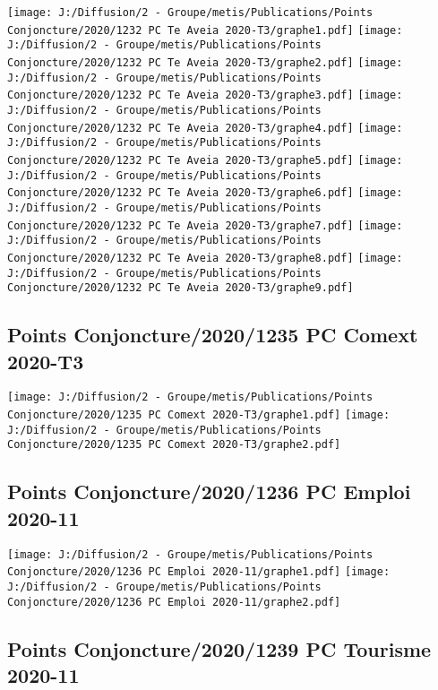 \documentclass[
]{article}
\begin{document}
\texttt{[image: J:/Diffusion/2 - Groupe/metis/Publications/Points Conjoncture/2020/1232 PC Te Aveia 2020-T3/graphe1.pdf]}
\texttt{[image: J:/Diffusion/2 - Groupe/metis/Publications/Points Conjoncture/2020/1232 PC Te Aveia 2020-T3/graphe2.pdf]}
\texttt{[image: J:/Diffusion/2 - Groupe/metis/Publications/Points Conjoncture/2020/1232 PC Te Aveia 2020-T3/graphe3.pdf]}
\texttt{[image: J:/Diffusion/2 - Groupe/metis/Publications/Points Conjoncture/2020/1232 PC Te Aveia 2020-T3/graphe4.pdf]}
\texttt{[image: J:/Diffusion/2 - Groupe/metis/Publications/Points Conjoncture/2020/1232 PC Te Aveia 2020-T3/graphe5.pdf]}
\texttt{[image: J:/Diffusion/2 - Groupe/metis/Publications/Points Conjoncture/2020/1232 PC Te Aveia 2020-T3/graphe6.pdf]}
\texttt{[image: J:/Diffusion/2 - Groupe/metis/Publications/Points Conjoncture/2020/1232 PC Te Aveia 2020-T3/graphe7.pdf]}
\texttt{[image: J:/Diffusion/2 - Groupe/metis/Publications/Points Conjoncture/2020/1232 PC Te Aveia 2020-T3/graphe8.pdf]}
\texttt{[image: J:/Diffusion/2 - Groupe/metis/Publications/Points Conjoncture/2020/1232 PC Te Aveia 2020-T3/graphe9.pdf]}

\hypertarget{points-conjoncture20201235-pc-comext-2020-t3}{%
\subsection{Points Conjoncture/2020/1235 PC Comext
2020-T3}\label{points-conjoncture20201235-pc-comext-2020-t3}}

\texttt{[image: J:/Diffusion/2 - Groupe/metis/Publications/Points Conjoncture/2020/1235 PC Comext 2020-T3/graphe1.pdf]}
\texttt{[image: J:/Diffusion/2 - Groupe/metis/Publications/Points Conjoncture/2020/1235 PC Comext 2020-T3/graphe2.pdf]}

\hypertarget{points-conjoncture20201236-pc-emploi-2020-11}{%
\subsection{Points Conjoncture/2020/1236 PC Emploi
2020-11}\label{points-conjoncture20201236-pc-emploi-2020-11}}

\texttt{[image: J:/Diffusion/2 - Groupe/metis/Publications/Points Conjoncture/2020/1236 PC Emploi 2020-11/graphe1.pdf]}
\texttt{[image: J:/Diffusion/2 - Groupe/metis/Publications/Points Conjoncture/2020/1236 PC Emploi 2020-11/graphe2.pdf]}

\hypertarget{points-conjoncture20201239-pc-tourisme-2020-11}{%
\subsection{Points Conjoncture/2020/1239 PC Tourisme
2020-11}\label{points-conjoncture20201239-pc-tourisme-2020-11}}
\end{document}
